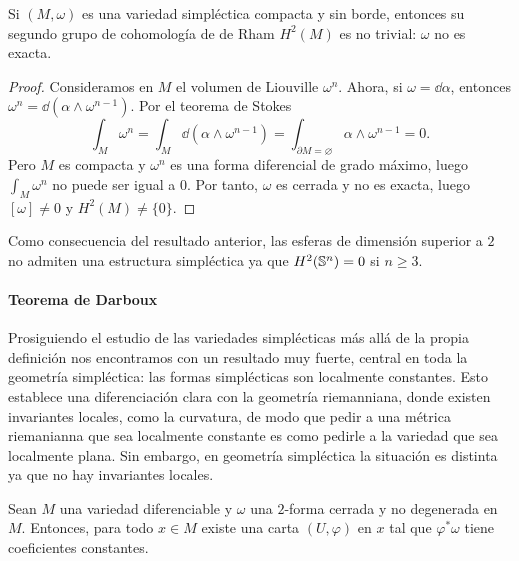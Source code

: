 \begin{prop}
  Si $(M,\omega)$ es una variedad simpléctica compacta y sin borde, entonces su segundo grupo de cohomología de de Rham $H^2(M)$ es no trivial: $\omega$ no es exacta.
\end{prop}
\begin{proof}
  Consideramos en $M$ el volumen de Liouville $\omega^n$. Ahora, si $\omega=\dd \alpha$, entonces $\omega^n=\dd (\alpha \wedge \omega^{n-1})$. Por el teorema de Stokes
  \begin{equation*}
    \int_M \omega^n=\int_M \dd (\alpha \wedge \omega^{n-1}) = \int_{\partial M=\varnothing} \alpha \wedge \omega^{n-1}=0.
  \end{equation*}
  Pero $M$ es compacta y $\omega^n$ es una forma diferencial de grado máximo, luego $\int_M \omega^n$ no puede ser igual a $0$. Por tanto, $\omega$ es cerrada y no es exacta, luego $[\omega]\neq 0$ y $H^2(M) \neq \{0\}$.
\end{proof}
Como consecuencia del resultado anterior, las esferas de dimensión superior a $2$ no admiten una estructura simpléctica ya que $H^2(\mathbb{S}^n)={0}$ si $n\geq 3$.

\paragraph{\bf Teorema de Darboux}\mbox{}

Prosiguiendo el estudio de las variedades simplécticas más allá de la propia definición nos encontramos con un resultado muy fuerte, central en toda la geometría simpléctica: las formas simplécticas son localmente constantes. Esto establece una diferenciación clara con la geometría riemanniana, donde existen invariantes locales, como la curvatura, de modo que pedir a una métrica riemanianna que sea localmente constante es como pedirle a la variedad que sea localmente plana. Sin embargo, en geometría simpléctica la situación es distinta ya que no hay invariantes locales. 

\begin{thm}[Darboux]\label{tdarboux}
 Sean $M$ una variedad diferenciable y $\omega$ una $2$-forma cerrada y no degenerada en $M$. Entonces, para todo $x\in M$ existe una carta $(U,\varphi)$ en $x$ tal que $\varphi^* \omega$ tiene coeficientes constantes.
\end{thm}

